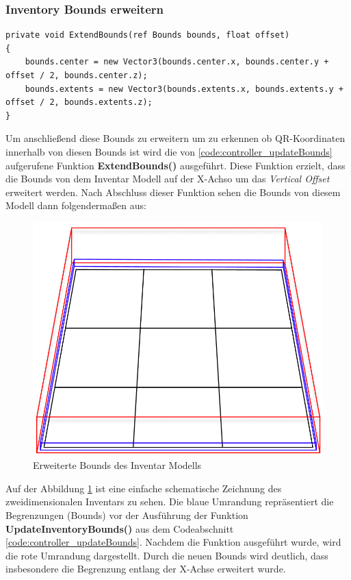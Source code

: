 \subsubsection{Inventory Bounds erweitern}
\begin{lstlisting}[style=csharp, caption={Funktion um Bounds zu erweitern}, label=code:controller_extendBounds]
private void ExtendBounds(ref Bounds bounds, float offset)
{
    bounds.center = new Vector3(bounds.center.x, bounds.center.y + offset / 2, bounds.center.z);
    bounds.extents = new Vector3(bounds.extents.x, bounds.extents.y + offset / 2, bounds.extents.z);
}
\end{lstlisting}
Um anschließend diese Bounds zu erweitern um zu erkennen ob QR-Koordinaten innerhalb von diesen Bounds ist wird die von
\ref{code:controller_updateBounds} aufgerufene Funktion \textbf{ExtendBounds()} ausgeführt. Diese Funktion erzielt, dass die
Bounds von dem Inventar Modell auf der X-Achso um das \textit{Vertical Offset} erweitert werden. Nach Abschluss dieser Funktion
sehen die Bounds von diesem Modell dann folgendermaßen aus:
\begin{figure}[h]
    \centering
    \includegraphics[scale=0.4]{images/extendedBounds}
    \caption{Erweiterte Bounds des Inventar Modells}
    \label{fig:extended_inventoryBounds}
\end{figure}

Auf der Abbildung \ref{fig:extended_inventoryBounds} ist eine einfache schematische Zeichnung des zweidimensionalen Inventars zu sehen. Die
blaue Umrandung repräsentiert die Begrenzungen (Bounds) vor der Ausführung der Funktion \textbf{UpdateInventoryBounds()}
aus dem Codeabschnitt \ref{code:controller_updateBounds}. Nachdem die Funktion ausgeführt wurde, wird die rote Umrandung
dargestellt. Durch die neuen Bounds wird deutlich, dass insbesondere die Begrenzung entlang der X-Achse erweitert wurde.

